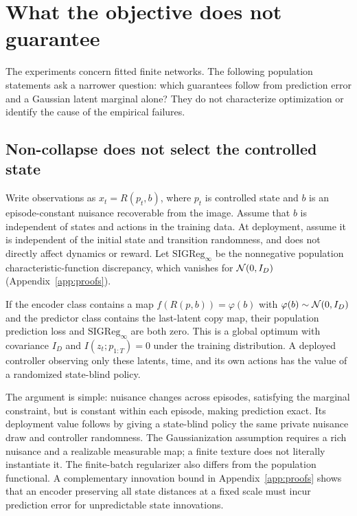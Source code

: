 \section{What the objective does not guarantee}
\label{sec:theory}

The experiments concern fitted finite networks. The following population statements ask a narrower
question: which guarantees follow from prediction error and a Gaussian latent marginal alone?
They do not characterize optimization or identify the cause of the empirical failures.

\subsection{Non-collapse does not select the controlled state}
\label{sec:theory-rep}

Write observations as $x_t=R(p_t,b)$, where $p_t$ is controlled state and $b$ is an episode-constant
nuisance recoverable from the image. Assume that $b$ is independent of states and actions in the
training data. At deployment, assume it is independent of the initial state and transition randomness,
and does not directly affect dynamics or reward. Let $\mathrm{SIGReg}_\infty$ be the nonnegative
population characteristic-function discrepancy, which vanishes for $\mathcal{N}(0,I_D)$
(Appendix~\ref{app:proofs}).

\begin{proposition}
\label{prop:representation}
If the encoder class contains a map $f(R(p,b))=\varphi(b)$ with
$\varphi(b)\sim\mathcal{N}(0,I_D)$ and the predictor class contains the last-latent copy map, their population
prediction loss and $\mathrm{SIGReg}_\infty$ are both zero. This is a global optimum with covariance
$I_D$ and $I(z_t;p_{1:T})=0$ under the training distribution. A deployed controller observing only
these latents, time, and its own actions has the value of a randomized state-blind policy.
\end{proposition}

The argument is simple: nuisance changes across episodes, satisfying the marginal constraint, but
is constant within each episode, making prediction exact. Its deployment value follows by giving a
state-blind policy the same private nuisance draw and controller randomness. The Gaussianization
assumption requires a rich nuisance and a realizable measurable map; a finite texture does not
literally instantiate it. The finite-batch regularizer also differs from the population functional.
A complementary innovation bound in Appendix~\ref{app:proofs} shows that an encoder preserving all
state distances at a fixed scale must incur prediction error for unpredictable state innovations.

